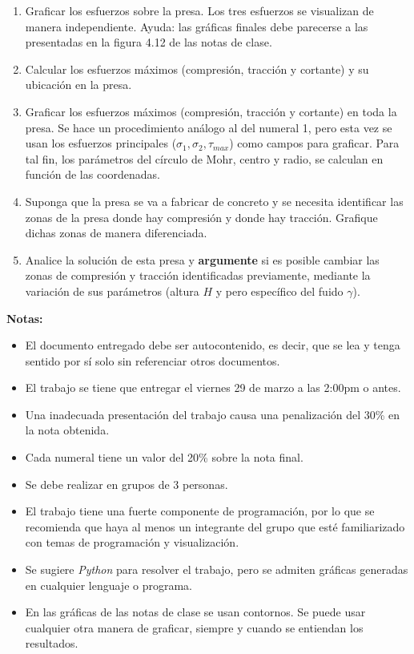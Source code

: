 \documentclass{exam}
\begin{document}
\begin{enumerate}
	\item Graficar los esfuerzos sobre la presa. Los tres esfuerzos se visualizan de manera independiente. Ayuda: las gráficas finales debe parecerse a las presentadas en la figura 4.12 de las notas de clase.
	
	\item Calcular los esfuerzos máximos (compresión, tracción y cortante) y su ubicación en la presa.
	
	\item Graficar los esfuerzos máximos (compresión, tracción y cortante) en toda la presa. Se hace un procedimiento análogo al del numeral 1, pero esta vez se usan los esfuerzos principales ($\sigma_1, \sigma_2, \tau_{max}$) como campos para graficar. Para tal fin, los parámetros del círculo de Mohr, centro y radio, se calculan en función de las coordenadas.
	
	\item Suponga que la presa se va a fabricar de concreto y se necesita identificar las zonas de la presa donde hay compresión y donde hay tracción. Grafique dichas zonas de manera diferenciada.
	
	\item Analice la solución de esta presa y \textbf{argumente} si es posible cambiar las zonas de compresión y tracción identificadas previamente, mediante la variación de sus parámetros (altura $H$ y pero específico del fuido $\gamma$).
	
\end{enumerate} 

\vspace{0.5cm}
\textbf{Notas:}
\begin{itemize}
	\item El documento entregado debe ser autocontenido, es decir, que se lea y tenga sentido por sí solo sin referenciar otros documentos.
	\item El trabajo se tiene que entregar el viernes 29 de marzo a las 2:00pm o antes.
	\item Una inadecuada presentación del trabajo causa una penalización del 30\% en la nota obtenida.
	\item Cada numeral tiene un valor del 20\% sobre la nota final.
	\item Se debe realizar en grupos de 3 personas.
	\item El trabajo tiene una fuerte componente de programación, por lo que se recomienda que haya al menos un integrante del grupo que esté familiarizado con temas de programación y visualización.
	\item Se sugiere \textit{Python} para resolver el trabajo, pero se admiten gráficas generadas en cualquier lenguaje o programa.
	\item En las gráficas de las notas de clase se usan contornos. Se puede usar cualquier otra manera de graficar, siempre y cuando se entiendan los resultados.
\end{itemize}
\end{document}
